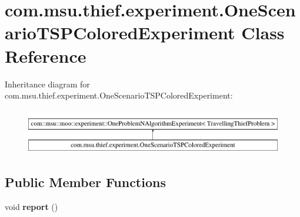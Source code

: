 \hypertarget{classcom_1_1msu_1_1thief_1_1experiment_1_1OneScenarioTSPColoredExperiment}{\section{com.\-msu.\-thief.\-experiment.\-One\-Scenario\-T\-S\-P\-Colored\-Experiment Class Reference}
\label{classcom_1_1msu_1_1thief_1_1experiment_1_1OneScenarioTSPColoredExperiment}
}
Inheritance diagram for com.\-msu.\-thief.\-experiment.\-One\-Scenario\-T\-S\-P\-Colored\-Experiment\-:\begin{figure}[H]
\begin{center}
\leavevmode
\includegraphics[height=2.000000cm]{classcom_1_1msu_1_1thief_1_1experiment_1_1OneScenarioTSPColoredExperiment}
\end{center}
\end{figure}
\subsection*{Public Member Functions}
\begin{DoxyCompactItemize}
\item 
\hypertarget{classcom_1_1msu_1_1thief_1_1experiment_1_1OneScenarioTSPColoredExperiment_aee1023321c1847259f1f1b9fbfb434ed}{void {\bfseries report} ()}\label{classcom_1_1msu_1_1thief_1_1experiment_1_1OneScenarioTSPColoredExperiment_aee1023321c1847259f1f1b9fbfb434ed}

\end{DoxyCompactItemize}
